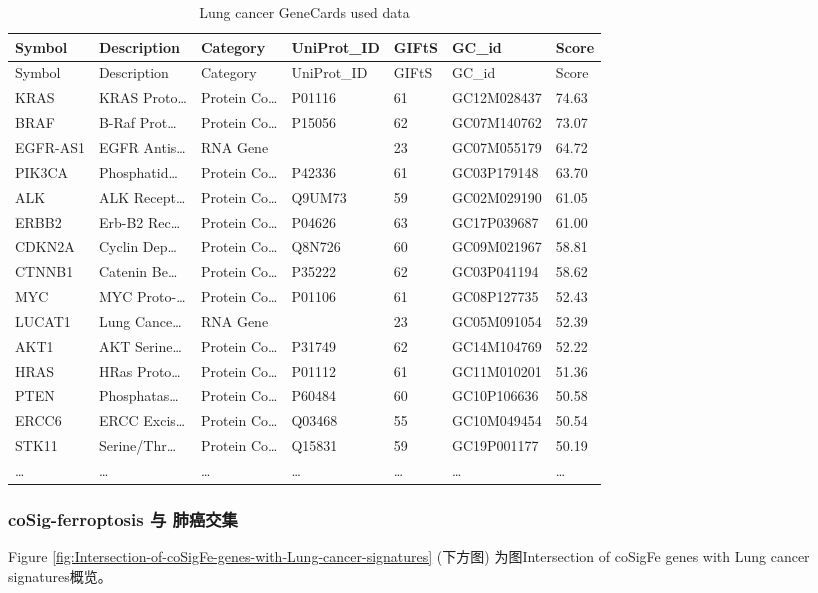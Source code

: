 \documentclass[
]{article}
\begin{document}
\begin{longtable}[]{@{}lllllll@{}}
\caption{\label{tab:Lung-cancer-GeneCards-used-data}Lung cancer GeneCards used data}\tabularnewline
\toprule
Symbol & Description & Category & UniProt\_ID & GIFtS & GC\_id & Score\tabularnewline
\midrule
\endfirsthead
\toprule
Symbol & Description & Category & UniProt\_ID & GIFtS & GC\_id & Score\tabularnewline
\midrule
\endhead
KRAS & KRAS Proto\ldots{} & Protein Co\ldots{} & P01116 & 61 & GC12M028437 & 74.63\tabularnewline
BRAF & B-Raf Prot\ldots{} & Protein Co\ldots{} & P15056 & 62 & GC07M140762 & 73.07\tabularnewline
EGFR-AS1 & EGFR Antis\ldots{} & RNA Gene & & 23 & GC07M055179 & 64.72\tabularnewline
PIK3CA & Phosphatid\ldots{} & Protein Co\ldots{} & P42336 & 61 & GC03P179148 & 63.70\tabularnewline
ALK & ALK Recept\ldots{} & Protein Co\ldots{} & Q9UM73 & 59 & GC02M029190 & 61.05\tabularnewline
ERBB2 & Erb-B2 Rec\ldots{} & Protein Co\ldots{} & P04626 & 63 & GC17P039687 & 61.00\tabularnewline
CDKN2A & Cyclin Dep\ldots{} & Protein Co\ldots{} & Q8N726 & 60 & GC09M021967 & 58.81\tabularnewline
CTNNB1 & Catenin Be\ldots{} & Protein Co\ldots{} & P35222 & 62 & GC03P041194 & 58.62\tabularnewline
MYC & MYC Proto-\ldots{} & Protein Co\ldots{} & P01106 & 61 & GC08P127735 & 52.43\tabularnewline
LUCAT1 & Lung Cance\ldots{} & RNA Gene & & 23 & GC05M091054 & 52.39\tabularnewline
AKT1 & AKT Serine\ldots{} & Protein Co\ldots{} & P31749 & 62 & GC14M104769 & 52.22\tabularnewline
HRAS & HRas Proto\ldots{} & Protein Co\ldots{} & P01112 & 61 & GC11M010201 & 51.36\tabularnewline
PTEN & Phosphatas\ldots{} & Protein Co\ldots{} & P60484 & 60 & GC10P106636 & 50.58\tabularnewline
ERCC6 & ERCC Excis\ldots{} & Protein Co\ldots{} & Q03468 & 55 & GC10M049454 & 50.54\tabularnewline
STK11 & Serine/Thr\ldots{} & Protein Co\ldots{} & Q15831 & 59 & GC19P001177 & 50.19\tabularnewline
\ldots{} & \ldots{} & \ldots{} & \ldots{} & \ldots{} & \ldots{} & \ldots{}\tabularnewline
\bottomrule
\end{longtable}

\hypertarget{cosig-ferroptosis-ux4e0e-ux80baux764cux4ea4ux96c6}{%
\subsubsection{coSig-ferroptosis 与 肺癌交集}\label{cosig-ferroptosis-ux4e0e-ux80baux764cux4ea4ux96c6}}

Figure \ref{fig:Intersection-of-coSigFe-genes-with-Lung-cancer-signatures} (下方图) 为图Intersection of coSigFe genes with Lung cancer signatures概览。
\end{document}
